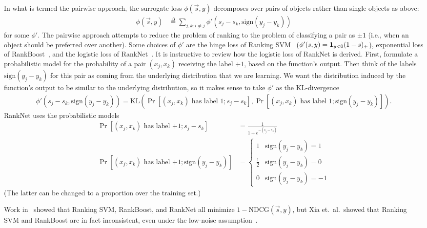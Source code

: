 In what is termed the pairwise approach, the surrogate loss
$\phi(\vec{s}, y)$ decomposes over pairs of objects rather than single objects
as above:
\begin{align*}
  \phi(\vec{s}, y)
  &\stackrel{\Delta}{=}
  \sum_{j,k : i \neq j} \phi'(s_j - s_k, \text{sign}(y_j - y_k)) 
\end{align*}
for some $\phi'$.
The pairwise approach attempts to reduce the problem of
ranking to the problem of classifying a pair as $\pm 1$ (i.e.,
when an object should be preferred over another). Some choices of $\phi'$
are the hinge loss of Ranking SVM~\cite{ranksvm}
($\phi'(s, y) = {\mathbf 1}_{y < 0}(1 - s)_+$),
exponential loss of RankBoost~\cite{rankboost},
and the logistic loss of RankNet~\cite{}.
It is instructive to review how the logistic loss of RankNet is derived.
First, formulate a probabilistic model for the probability
of a pair $(x_j, x_k)$ receiving the label $+1$, based on the function's
output. Then think of the labels $\text{sign}(y_j - y_k)$
for this pair as coming from the underlying distribution that we are learning.
We want the distribution induced by the function's output to be similar to the
underlying distribution, so it makes sense to take $\phi'$ as the KL-divergence
\begin{align*}
  \phi'(s_j - s_k, \text{sign}(y_j - y_k))
  = \text{KL}(\Pr[\text{$(x_j, x_k)$ has label $1$} ; s_j - s_k], \Pr[\text{$(x_j, x_k)$ has label $1$} ; \text{sign}(y_j - y_k)]).
\end{align*}
RankNet uses the probabilistic models
\begin{align*}
  \Pr[\text{$(x_j, x_k)$ has label $+1$}; s_j - s_k] &= \frac{1}{1 + e^{-(s_j - s_k)}} \\
  \Pr[\text{$(x_j, x_k)$ has label $+1$} ; \text{sign}(y_j - y_k)] &=
  \begin{cases}
    1 & \text{sign}(y_j - y_k) = 1 \\
    \frac{1}{2} & \text{sign}(y_j - y_k) = 0 \\
    0 & \text{sign}(y_j - y_k) = -1
  \end{cases}
\end{align*}
(The latter can be changed to a proportion over the training set.)

Work in~\cite{ranking-measures-and-loss-functions} showed that Ranking SVM,
RankBoost, and RankNet all minimize $1 - \text{NDCG}(\vec{s}, y)$, but
Xia et.\ al.\ showed that Ranking SVM and RankBoost are in fact inconsistent,
even under the low-noise assumption~\cite{xia2008listwise}.

